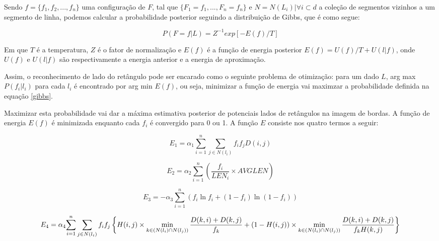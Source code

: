 
Sendo $ f = \{f_1,f_2,...,f_n\} $ uma configuração de $F$, tal que $ \{F_1 = f_1,...,F_n=f_n\} $ e $ N = {N(L_i)| \forall i \subset d} $ a coleção de segmentos vizinhos a um segmento de linha, podemos calcular a probabilidade posterior seguindo a distribuição de Gibbs, que é como segue:

\begin{equation} \label{gibbs}
 P(F = f|L) = Z^{-1} exp[-E(f)/T] 
\end{equation}

Em que $T$ é a temperatura, $Z$ é o fator de normalização e $E(f)$ é a função de energia posterior $ E(f)=U(f)/T+U(l|f) $, onde $U(f)$ e $U(l|f)$ são respectivamente a energia anterior e a energia de aproximação.

Assim, o reconhecimento de lado do retângulo pode ser encarado como o seguinte problema de otimização: para um dado $L$, arg max $ P(f_i|l_i) $ para cada $ l_i $ é encontrado por arg min $ E(f) $, ou seja, minimizar a função de energia vai maximzar a probabilidade definida na equação \ref{gibbs}.

Maximizar esta probabilidade vai dar a máxima estimativa posterior de potenciais lados de retângulos na imagem de bordas. A função de energia $ E(f) $ é minimizada enquanto cada $ f_i $ é convergido para 0 ou 1. A função $ E $ consiste nos quatro termos a seguir:

\begin{equation}
E_1 = \alpha _1 {\sum_{i=1}^{n} {\sum_ {j\in N(l_i)}^{}f_if_jD(i,j)}} \label{e1}
\end{equation}

\begin{equation}
E_2 = \alpha _2 {\sum_{i=1}^{n} (\frac{f_i}{LEN_i}\times AVGLEN)}  \label{e2}
\end{equation}

\begin{equation}
E_3 = -\alpha _3 {\sum_{i=1}^{n} (f_i \ln f_i + (1-f_i)\ln(1-f_i))} \label{e3}
\end{equation}

\begin{equation}
E_4 = \alpha_4 {\sum_{i=1}^{n} {\sum_ {j\in N(l_i)}^{}f_if_j\left \{ H(i,j)\times \min_{k\in (N(l_i)\cap N(l_j))} \frac{D(k,i)+D(k,j)}{f_k} + \\ 	(1-H(i,j))\times \min_{k\in (N(l_i)\cap N(l_j))} \frac{D(k,i)+D(k,j)}{f_kH(k,j)} \right \}}} \label{e4}
\end{equation}

